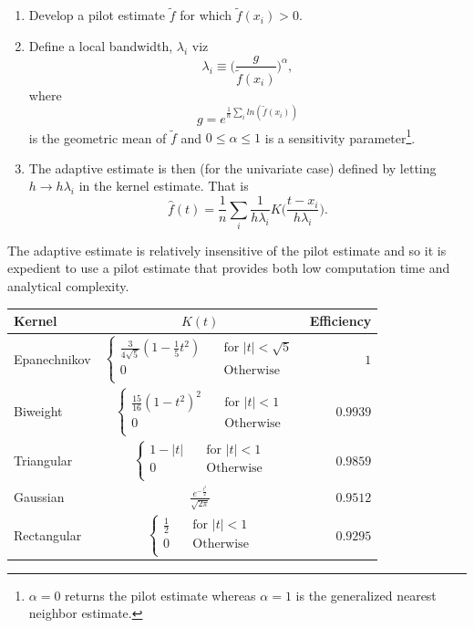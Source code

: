 \begin{enumerate}
	\item Develop a pilot estimate $\tilde{f}$ for which $\tilde{f}(x_i)>0$.
	\item Define a local bandwidth, $\lambda_i$ viz
	\begin{equation}
		\lambda_i\equiv \bigg(\frac{g}{\tilde{f}(x_i)}\bigg)^\alpha,
		\label{lam}
	\end{equation}
	where
	\begin{equation}
		g=e^{\frac{1}{n}\sum_{i}ln(\tilde{f}(x_i))}
	\end{equation}
	is the geometric mean of $\tilde{f}$ and $0\leq \alpha\leq 1$ is a sensitivity parameter\footnote{$\alpha=0$ returns the pilot estimate whereas $\alpha=1$ is the generalized nearest neighbor estimate.}. 
	\item The adaptive estimate is then (for the univariate case) defined  by letting $h\rightarrow h\lambda_i$ in the kernel estimate. That is
	\begin{equation}
		\hat{f}(t)=\frac{1}{n}\sum_{i}\frac{1}{h\lambda_i}K\bigg(\frac{t-x_i}{h\lambda_i}\bigg).
	\end{equation}
\end{enumerate}
The adaptive estimate is relatively insensitive of the pilot estimate and so it is expedient to use a pilot estimate that provides both low computation time and analytical complexity.
\begin{center}
	\begin{tabular}{ l| c r}
		Kernel & $K(t)$ & Efficiency \\
		\hline
		Epanechnikov & $\begin{cases}
			\frac{3}{4\sqrt{5}}(1-\frac{1}{5}t^2)&\quad \text{for } |t|<\sqrt{5}\\
			0&\quad \text{Otherwise}\\
		\end{cases}$  & $1$\\
		Biweight & $\begin{cases}
			\frac{15}{16}(1-t^2)^2&\quad \text{for } |t|<1\\
			0&\quad \text{Otherwise}\\
		\end{cases}$  & $0.9939$\\
		Triangular & $\begin{cases}
			1-|t|&\quad \text{for } |t|<1\\
			0&\quad \text{Otherwise}\\
		\end{cases}$  & $0.9859$\\
		Gaussian & $\frac{e^{-\frac{t^2}{2}}}{\sqrt{2\pi}}$  & $0.9512$\\
		Rectangular & $\begin{cases}
			\frac{1}{2}&\quad \text{for } |t|<1\\
			0&\quad \text{Otherwise}\\
		\end{cases}$  & $0.9295$\\
	\end{tabular}
	\captionsetup{width=0.95\textwidth}
	\label{t2}
\end{center}
